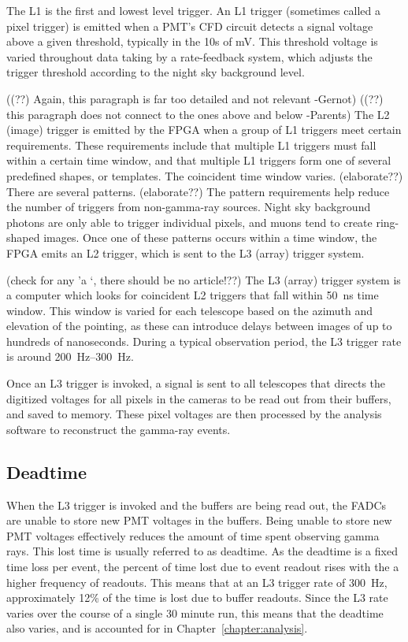 The L1 is the first and lowest level trigger.
An L1 trigger (sometimes called a pixel trigger) is emitted when a PMT's CFD circuit detects a signal voltage above a given threshold, typically in the 10s of mV.
This threshold voltage is varied throughout data taking by a rate-feedback system, which adjusts the trigger threshold according to the night sky background level.

{\color{red}((??) Again, this paragraph is far too detailed and not relevant -Gernot)}
{\color{red}((??) this paragraph does not connect to the ones above and below -Parents)}
The L2 (image) trigger is emitted by the FPGA when a group of L1 triggers meet certain requirements.
These requirements include that multiple L1 triggers must fall within a certain time window, and that multiple L1 triggers form one of several predefined shapes, or templates.
The coincident time window varies. {\color{red}(elaborate??)}
There are several patterns. {\color{red}(elaborate??)}
The pattern requirements help reduce the number of triggers from non-gamma-ray sources.
Night sky background photons are only able to trigger individual pixels, and muons tend to create ring-shaped images.
Once one of these patterns occurs within a time window, the FPGA emits an L2 trigger, which is sent to the L3 (array) trigger system.

{\color{red}(check for any 'a \nicetilde`, there should be no article!??)}
The L3 (array) trigger system is a computer which looks for coincident L2 triggers that fall within \nicetilde\SI{50}{ns} time window.
This window is varied for each telescope based on the azimuth and elevation of the pointing, as these can introduce delays between images of up to hundreds of nanoseconds.
During a typical observation period, the L3 trigger rate is around \SIrange{200}{300}{Hz}.

Once an L3 trigger is invoked, a signal is sent to all telescopes that directs the digitized voltages for all pixels in the cameras to be read out from their buffers, and saved to memory.
These pixel voltages are then processed by the analysis software to reconstruct the gamma-ray events.



\subsection{Deadtime}
When the L3 trigger is invoked and the buffers are being read out, the FADCs are unable to store new PMT voltages in the buffers.
Being unable to store new PMT voltages effectively reduces the amount of time spent observing gamma rays.
This lost time is usually referred to as deadtime.
As the deadtime is a fixed time loss per event, the percent of time lost due to event readout rises with the a higher frequency of readouts.
This means that at an L3 trigger rate of \nicetilde{}\SI{300}{Hz}, approximately \nicetilde{}12\% of the time is lost due to buffer readouts.
Since the L3 rate varies over the course of a single 30 minute run, this means that the deadtime also varies, and is accounted for in Chapter~\ref{chapter:analysis}.

